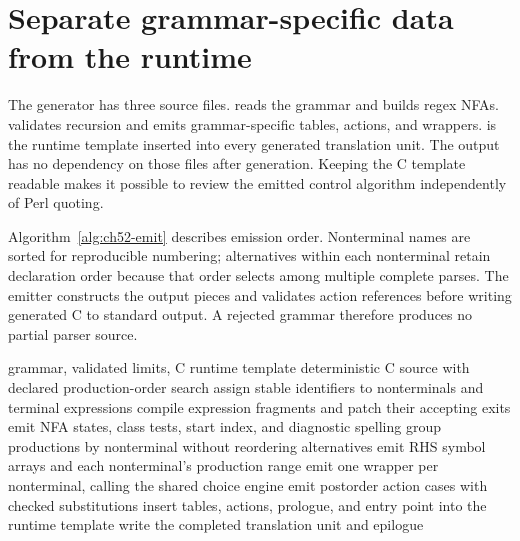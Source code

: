 \begin{listing}[htbp]
\inputminted[firstline=31,lastline=51]{perl}{support/aurocks-emit.pl}
\caption{The Perl generator follows every nullable-prefix call and rejects a cycle before emitting C.}
\label{lst:ch52-left-corners}
\end{listing}

\section{Separate grammar-specific data from the runtime}
\label{sec:ch52-emission}

The generator has three source files.
 reads the grammar and builds regex NFAs.
 validates recursion and emits grammar-specific tables, actions, and wrappers.
 is the runtime template inserted into every generated translation unit.
The output has no dependency on those files after generation.
Keeping the C template readable makes it possible to review the emitted control algorithm independently of Perl quoting.

Algorithm~\ref{alg:ch52-emit} describes emission order.
Nonterminal names are sorted for reproducible numbering; alternatives within each nonterminal retain declaration order because that order selects among multiple complete parses.
The emitter constructs the output pieces and validates action references before writing generated C to standard output.
A rejected grammar therefore produces no partial parser source.

\begin{algorithm}[htbp]
\caption{Emit a standalone C99 parser from a validated grammar.}
\label{alg:ch52-emit}
\begin{pseudocode}
\Require grammar, validated limits, C runtime template
\Ensure deterministic C source with declared production-order search
\State assign stable identifiers to nonterminals and terminal expressions
  \State compile expression fragments and patch their accepting exits
  \State emit NFA states, class tests, start index, and diagnostic spelling
\EndFor
\State group productions by nonterminal without reordering alternatives
\State emit RHS symbol arrays and each nonterminal's production range
\State emit one wrapper per nonterminal, calling the shared choice engine
\State emit postorder action cases with checked substitutions
\State insert tables, actions, prologue, and entry point into the runtime template
\State write the completed translation unit and epilogue
\end{pseudocode}
\end{algorithm}

